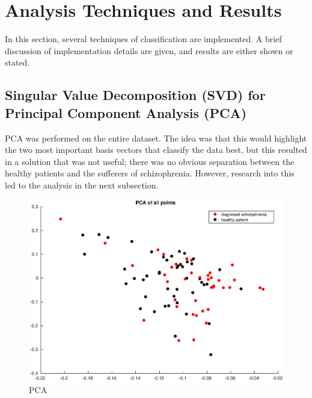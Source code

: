 \documentclass{article}
\begin{document}
\section{Analysis Techniques and Results}
In this section, several techniques of classification are implemented. A brief discussion of implementation details are given, and results are either shown or stated.

\subsection{Singular Value Decomposition (SVD) for Principal Component Analysis (PCA)}
PCA was performed on the entire dataset. The idea was that this would highlight the two most important basis vectors that classify the data best, but this resulted in a solution that was not useful; there was no obvious separation between the healthy patients and the sufferers of schizophrenia. However, research into this led to the analysis in the next subsection.
\begin{figure}[H]
    \centering
    \includegraphics[width = \textwidth]{PCA.eps}
    \caption{PCA}
\end{figure}
\end{document}
